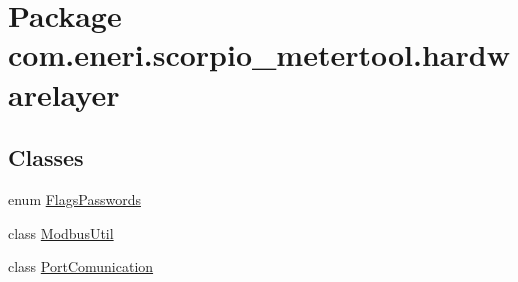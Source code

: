 \hypertarget{namespacecom_1_1eneri_1_1scorpio__metertool_1_1hardwarelayer}{}\section{Package com.\+eneri.\+scorpio\+\_\+metertool.\+hardwarelayer}
\label{namespacecom_1_1eneri_1_1scorpio__metertool_1_1hardwarelayer}
\subsection*{Classes}
\begin{DoxyCompactItemize}
\item 
enum \hyperlink{enumcom_1_1eneri_1_1scorpio__metertool_1_1hardwarelayer_1_1_flags_passwords}{Flags\+Passwords}
\item 
class \hyperlink{classcom_1_1eneri_1_1scorpio__metertool_1_1hardwarelayer_1_1_modbus_util}{Modbus\+Util}
\item 
class \hyperlink{classcom_1_1eneri_1_1scorpio__metertool_1_1hardwarelayer_1_1_port_comunication}{Port\+Comunication}
\end{DoxyCompactItemize}
